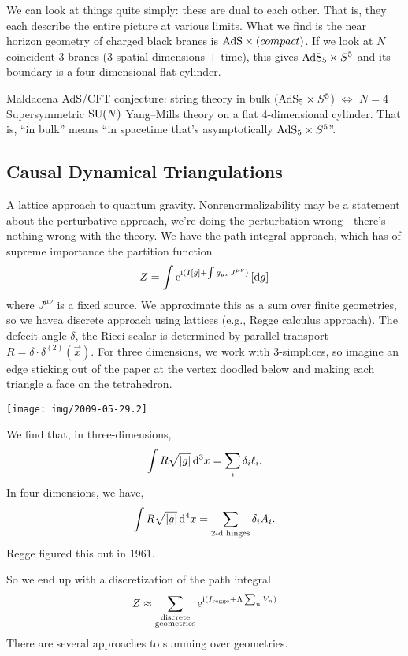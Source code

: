 We can look at things quite simply: these are dual to each other. That
is, they each describe the entire picture at various limits. What we
find is the near horizon geometry of charged black branes is
$\mathrm{AdS}\times{(compact)}$. If we look at $N$ coincident $3$-branes (3
spatial dimensions $+$ time), this gives $\mathrm{AdS}_{5}\times S^{5}$ and its
boundary is a four-dimensional flat cylinder.

Maldacena AdS/CFT conjecture: string theory in bulk ($\mathrm{AdS}_{5}\times S^{5}$)
$\iff$ $N=4$ Supersymmetric $\operatorname{SU}(N)$ Yang--Mills theory on a flat
4-dimensional cylinder.
That is, ``in bulk'' means ``in spacetime that's asymptotically $\mathrm{AdS}_{5}\times S^{5}$''.

\subsection{Causal Dynamical Triangulations}
A lattice approach to quantum gravity. Nonrenormalizability may be a
statement about the perturbative approach, we're doing the perturbation
wrong---there's nothing wrong with the theory. We have the path integral
approach, which has of supreme importance the partition function
\begin{equation}
Z = \int\mathrm{e}^{\mathrm{i}(I[g] + \int g_{\mu\nu}J^{\mu\nu})}\,[\mathrm{d} g]
\end{equation}
where $J^{\mu\nu}$ is a fixed source. We approximate this as a sum over
finite geometries, so we havea discrete approach using lattices (e.g.,
Regge calculus approach). The defecit angle $\delta$, the Ricci scalar
is determined by parallel transport $R =
\delta\cdot\delta^{(2)}(\vec{x})$. For three dimensions, we work with
3-simplices, so imagine an edge sticking out of the paper at the vertex
doodled below and making each triangle a face on the tetrahedron.
\begin{center}
  \texttt{[image: img/2009-05-29.2]}
\end{center}
We find that, in three-dimensions,
\begin{equation}
\int R\sqrt{|g|}\,\mathrm{d}^{3}x = \sum_{i}\delta_{i}\ell_{i}.
\end{equation}
In four-dimensions, we have,
\begin{equation}
\int R\sqrt{|g|}\,\mathrm{d}^{4}x = \sum_{\text{2-d hinges}}\delta_{i}A_{i}.
\end{equation}
Regge figured this out in 1961.

So we end up with a discretization of the path integral
\begin{equation}
Z\approx\sum_{\substack{\text{discrete}\\\text{geometries}}}\mathrm{e}^{\mathrm{i}(I_{\text{regge}}+\Lambda\sum_{n}V_{n})}
\end{equation}
There are several approaches to summing over geometries.

